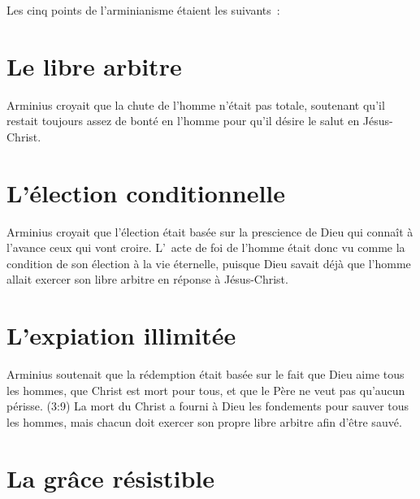 
Les \og cinq points de l'arminianisme \fg{}
 étaient les suivants~:

\section*{Le libre arbitre}

\begin{pocketpar}{}
Arminius croyait que la chute de
 l'homme n'était pas totale,
 soute\-nant qu'il restait toujours assez de bonté en l'homme
 pour qu'il désire le salut en Jésus-Christ.
\end{pocketpar}

\section*{L'élection conditionnelle}

\begin{pocketpar}{}
Arminius croyait que l'élection
 était basée sur la prescience
 de Dieu qui connaît à l'avance ceux qui vont croire.
 L'~\og acte de foi \fg{} de l'homme était donc vu comme la \og condition \fg{} 
 de son élection à la vie éternelle, puisque Dieu savait déjà
 que l'homme allait exercer son \og libre arbitre \fg{}
 en réponse à Jésus-Christ.
\end{pocketpar}

\section*{L'expiation illimitée}

Arminius soutenait que la rédemption était basée sur le fait
 que Dieu aime tous les hom\-mes, que Christ est mort pour tous,
 et que le Père ne veut pas qu'aucun périsse.
 (3:9)
 La mort du Christ a fourni à Dieu les fondements
 pour sauver tous les
 hommes, mais chacun doit exercer son propre
 \og libre arbitre \fg{} afin
 d'être sauvé.

\section*{La grâce résistible}


